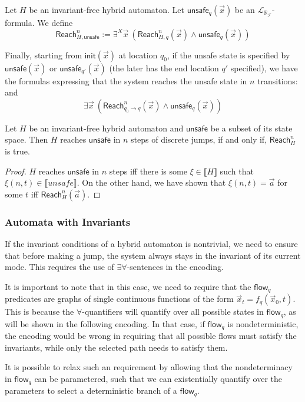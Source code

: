 \documentclass[envcountsect]{llncs}
\newcommand{\flow}{\mathsf{flow}}
\newcommand{\init}{\mathsf{init}}
\newcommand{\reach}{\mathsf{Reach}}
\newcommand{\unsafe}{\mathsf{unsafe}}
\newcommand{\lrf}{\mathcal{L}_{\mathbb{R}_{\mathcal{F}}}}
\begin{document}
\begin{definition}[$\reach^n_{H,\unsafe}$] Let $H$ be an invariant-free hybrid automaton. Let $\unsafe_q(\vec x)$ be an $\lrf$-formula. We define
$$\reach^n_{H,\unsafe}:= \exists^X \vec x \ (\reach^n_{H,q}(\vec x)\wedge \unsafe_q(\vec x))$$
\end{definition}

Finally, starting from $\init(\vec x)$ at location $q_0$, if the unsafe state is specified by $\unsafe(\vec x)$ or $\unsafe_{q'}(\vec x)$ (the later has the end location $q'$ specified), we have the formulas expressing that the system reaches the unsafe state in $n$ transitions:
and
$$\exists \vec x\ (\reach^n_{q_0\rightarrow q}(\vec x)\wedge \unsafe_q(\vec x))$$

\begin{corollary}
Let $H$ be an invariant-free hybrid automaton and $\unsafe$ be a subset of its state space. Then $H$ reaches $\unsafe$ in $n$ steps of discrete jumps, if and only if, $\reach^n_{H}$ is true. 
\end{corollary}

\begin{proof}
$H$ reaches $\unsafe$ in $n$ steps iff there is some $\xi\in \llbracket H\rrbracket$ such that $\xi(n, t)\in \llbracket unsafe\rrbracket$. On the other hand, we have shown that $\xi(n, t) = \vec a$ for some $t$ iff $\reach_H^n(\vec a)$.
\end{proof}


\subsubsection{Automata with Invariants}\label{auto_inv}

If the invariant conditions of a hybrid automaton is nontrivial, we need to ensure that before making a jump, the system always stays in the invariant of its current mode. This requires the use of $\exists\forall$-sentences in the encoding. 

\begin{remark}
It is important to note that in this case, we need to require that the $\flow_q$ predicates are graphs of single continuous functions of the form $\vec x_t = f_q(\vec x_0, t)$. This is because the $\forall$-quantifiers will quantify over all possible states in $\flow_q$, as will be shown in the following encoding. In that case, if $\flow_q$ is nondeterministic, the encoding would be wrong in requiring that all possible flows must satisfy the invariants, while only the selected path needs to satisfy them. 

It is possible to relax such an requirement by allowing that the nondeterminacy in $\flow_q$ can be parametered, such that we can existentially quantify over the parameters to select a deterministic branch of a $\flow_q$. 
\end{remark}
\end{document}
